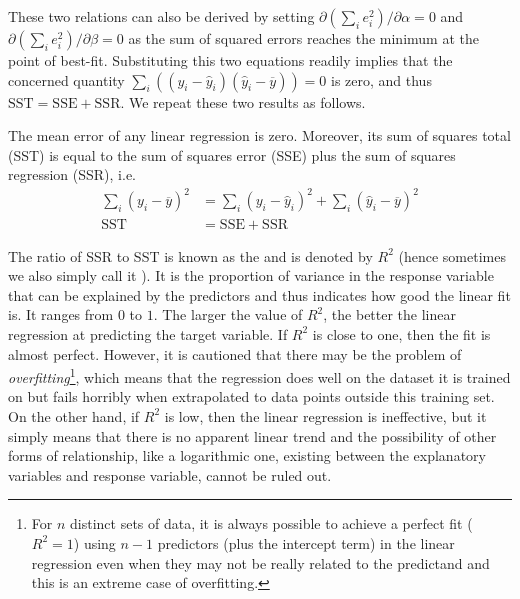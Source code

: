 These two relations can also be derived by setting $\partial (\sum_i e_i^2)/\partial \alpha = 0$ and $\partial (\sum_i e_i^2)/\partial \beta = 0$ as the sum of squared errors reaches the minimum at the point of best-fit. Substituting this two equations readily implies that the concerned quantity $\sum_i ((y_i - \hat{y}_i) (\hat{y}_i - \overline{y})) = 0$ is zero, and thus $\text{SST} = \text{SSE} + \text{SSR}$. We repeat these two results as follows.
\begin{proper}
The mean error of any linear regression is zero. Moreover, its sum of squares total (SST) is equal to the sum of squares error (SSE) plus the sum of squares regression (SSR), i.e.\ 
\begin{subequations}
\begin{align}
\sum_i (y_i - \overline{y})^2 &= \sum_i (y_i - \hat{y}_i)^2 + \sum_i (\hat{y}_i - \overline{y})^2 \\
\text{SST} &= \text{SSE} + \text{SSR}   
\end{align}    
\end{subequations}
\end{proper}
The ratio of SSR to SST is known as the  and is denoted by $R^2$ (hence sometimes we also simply call it ). It is the proportion of variance in the response variable that can be explained by the predictors and thus indicates how good the linear fit is. It ranges from $0$ to $1$. The larger the value of $R^2$, the better the linear regression at predicting the target variable. If $R^2$ is close to one, then the fit is almost perfect. However, it is cautioned that there may be the problem of \textit{overfitting}\footnote{For $n$ distinct sets of data, it is always possible to achieve a perfect fit ($R^2 = 1$) using $n-1$ predictors (plus the intercept term) in the linear regression even when they may not be really related to the predictand and this is an extreme case of overfitting.}, which means that the regression does well on the dataset it is trained on but fails horribly when extrapolated to data points outside this training set. On the other hand, if $R^2$ is low, then the linear regression is ineffective, but it simply means that there is no apparent linear trend and the possibility of other forms of relationship, like a logarithmic one, existing between the explanatory variables and response variable, cannot be ruled out.

